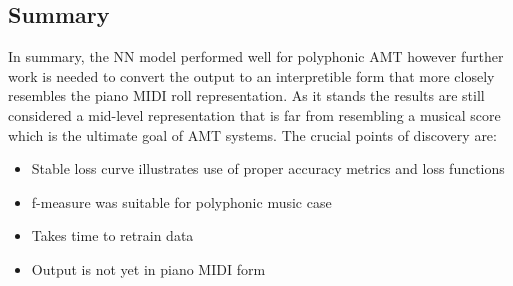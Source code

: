 \subsection{Summary}
In summary, the \ac{NN} model performed well for polyphonic AMT however further work
is needed to convert the output to an interpretible form that more closely resembles the piano \ac{MIDI} roll representation.
As it stands the results are still considered a mid-level representation that is far from
resembling a musical score which is the ultimate goal of AMT systems.
The crucial points of discovery are:
\begin{itemize}
    \item Stable loss curve illustrates use of proper accuracy metrics and loss functions
    \item f-measure was suitable for polyphonic music case
    \item Takes time to retrain data
    \item Output is not yet in piano \ac{MIDI} form
\end{itemize}




